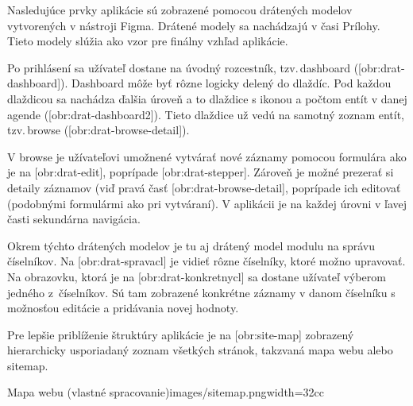 Nasledujúce prvky aplikácie sú zobrazené pomocou drátených modelov vytvorených v nástroji Figma. Drátené modely sa nachádzajú v časi Prílohy. Tieto modely slúžia ako vzor pre finálny vzhľad aplikácie.

Po prihlásení sa užívateľ dostane na úvodný rozcestník, tzv.\,dashboard ([obr:drat-dashboard]). Dashboard môže byť rôzne logicky delený do dlaždíc. Pod každou dlaždicou sa nachádza ďalšia úroveň a to dlaždice s ikonou a počtom entít v danej agende ([obr:drat-dashboard2]). Tieto dlaždice už vedú na samotný zoznam entít, tzv.\,browse ([obr:drat-browse-detail]).


%

%
%

V browse je užívateľovi umožnené vytvárať nové záznamy pomocou formulára ako je na [obr:drat-edit], poprípade [obr:drat-stepper]. Zároveň je možné prezerať si detaily záznamov (viď pravá časť [obr:drat-browse-detail], poprípade ich editovať (podobnými formulármi ako pri vytváraní). V aplikácii je na každej úrovni v ľavej časti sekundárna navigácia.

Okrem týchto drátených modelov je tu aj drátený model modulu na správu číselníkov. Na [obr:drat-spravacl] je vidieť rôzne číselníky, ktoré možno upravovať. Na obrazovku, ktorá je na [obr:drat-konkretnycl] sa dostane užívateľ výberom jedného z~číselníkov. Sú tam zobrazené konkrétne záznamy v danom číselníku s možnosťou editácie a pridávania novej hodnoty.

\blank
Pre lepšie priblíženie štruktúry aplikácie je na [obr:site-map] zobrazený hierarchicky usporiadaný zoznam všetkých stránok, takzvaná mapa webu alebo sitemap.

{Mapa webu (vlastné spracovanie)}{images/sitemap.png}{width=32cc} 


